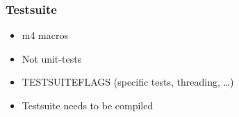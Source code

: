 \documentclass{beamer}
\begin{document}
\begin{frame}
  \frametitle{Testsuite}
    \begin{itemize}[<+->]
      \item m4 macros
      \item Not unit-tests
      \item TESTSUITEFLAGS (specific tests, threading, \ldots)
      \item Testsuite needs to be compiled
    \end{itemize}
\end{frame}
\end{document}
